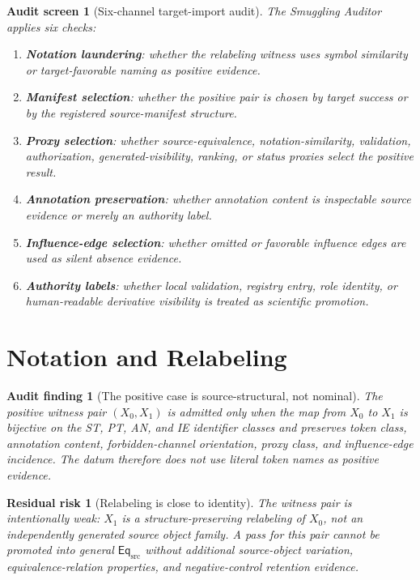 \documentclass[11pt]{article}
\newcommand{\EqSrc}{\mathsf{Eq}_{\mathrm{src}}}
\newtheorem{auditscreen}{Audit screen}
\newtheorem{auditfinding}{Audit finding}
\newtheorem{residualrisk}{Residual risk}
\begin{document}
\begin{auditscreen}[Six-channel target-import audit]
The Smuggling Auditor applies six checks:
\begin{enumerate}
    \item \textbf{Notation laundering}: whether the relabeling witness uses
    symbol similarity or target-favorable naming as positive evidence.
    \item \textbf{Manifest selection}: whether the positive pair is chosen
    by target success or by the registered source-manifest structure.
    \item \textbf{Proxy selection}: whether source-equivalence,
    notation-similarity, validation, authorization, generated-visibility,
    ranking, or status proxies select the positive result.
    \item \textbf{Annotation preservation}: whether annotation content is
    inspectable source evidence or merely an authority label.
    \item \textbf{Influence-edge selection}: whether omitted or favorable
    influence edges are used as silent absence evidence.
    \item \textbf{Authority labels}: whether local validation, registry
    entry, role identity, or human-readable derivative visibility is treated
    as scientific promotion.
\end{enumerate}
\end{auditscreen}

\section{Notation and Relabeling}

\begin{auditfinding}[The positive case is source-structural, not nominal]
The positive witness pair \((X_{0},X_{1})\) is admitted only when the map
from \(X_{0}\) to \(X_{1}\) is bijective on the ST, PT, AN, and IE
identifier classes and preserves token class, annotation content,
forbidden-channel orientation, proxy class, and influence-edge incidence.
The datum therefore does not use literal token names as positive evidence.
\end{auditfinding}

\begin{residualrisk}[Relabeling is close to identity]
The witness pair is intentionally weak: \(X_{1}\) is a
structure-preserving relabeling of \(X_{0}\), not an independently
generated source object family. A pass for this pair cannot be promoted
into general \(\EqSrc\) without additional source-object variation,
equivalence-relation properties, and negative-control retention evidence.
\end{residualrisk}
\end{document}
